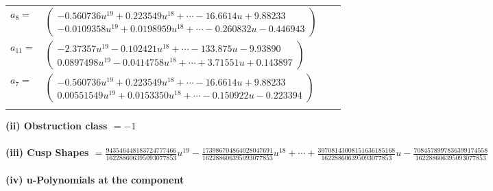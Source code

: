 \documentclass[1p]{elsarticle_modified}
\theoremstyle{definition}
\begin{document}
\begin{tabular}{m{7pt} m{180pt} m{7pt} m{180pt} }
\flushright $a_{8}=$&$\begin{pmatrix}-0.560736 u^{19}+0.223549 u^{18}+\cdots-16.6614 u+9.88233\\-0.0109358 u^{19}+0.0198959 u^{18}+\cdots-0.260832 u-0.446943\end{pmatrix}$ \\
\flushright $a_{11}=$&$\begin{pmatrix}-2.37357 u^{19}-0.102421 u^{18}+\cdots-133.875 u-9.93890\\0.0897498 u^{19}-0.0414758 u^{18}+\cdots+3.71551 u+0.143897\end{pmatrix}$ \\
\flushright $a_{7}=$&$\begin{pmatrix}-0.560736 u^{19}+0.223549 u^{18}+\cdots-16.6614 u+9.88233\\0.00551549 u^{19}+0.0153350 u^{18}+\cdots-0.150922 u-0.223394\end{pmatrix}$\\&\end{tabular}
\flushleft \textbf{(ii) Obstruction class $= -1$}\\~\\
\flushleft \textbf{(iii) Cusp Shapes $= \frac{943546448183724777466}{162288606395093077853} u^{19}-\frac{173986704864028047691}{162288606395093077853} u^{18}+\cdots+\frac{39708143008151636185168}{162288606395093077853} u-\frac{7084578997836399174558}{162288606395093077853}$}\\~\\
\newpage\renewcommand{\arraystretch}{1}
\flushleft \textbf{(iv) u-Polynomials at the component}\newline \\
\end{document}
